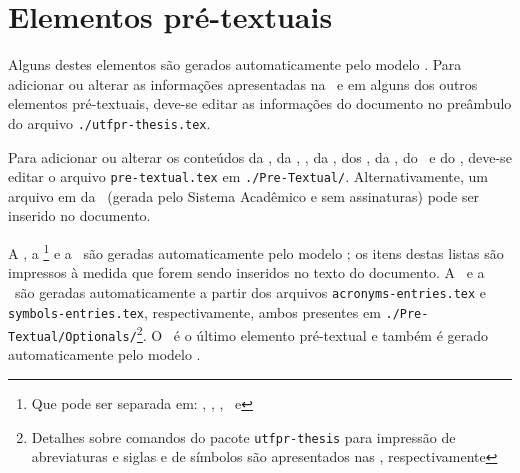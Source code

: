\section{Elementos pré-textuais}%
\label{sect:pre-text}

Alguns destes elementos são gerados automaticamente pelo modelo .
Para adicionar ou alterar as informações apresentadas na \cvrref\ e em alguns dos outros elementos pré-textuais, deve-se editar as informações do documento no preâmbulo do arquivo \texttt{./utfpr-thesis.tex}.

Para adicionar ou alterar os conteúdos da \ttlpgref, da \errref, \apvlpgref, da \dedref, dos \ackref, da \epiref, do \resref\ e do \absref, deve-se editar o arquivo \texttt{pre-textual.tex} em \texttt{./Pre-Textual/}.
Alternativamente, um arquivo em  da \apvlpgref\ (gerada pelo Sistema Acadêmico e sem assinaturas) pode ser inserido no documento.

A \loaref, a \loiref\footnote{Que pode ser separada em: \lofref, \lowref, \lopref, \lohref\ e \lodref} e a \lotref\ são geradas automaticamente pelo modelo ; os itens destas listas são impressos à medida que forem sendo inseridos no texto do documento.
A \acrref\ e a \symref\ são geradas automaticamente a partir dos arquivos \texttt{acronyms-entries.tex} e \texttt{symbols-entries.tex}, respectivamente, ambos presentes em \texttt{./Pre-Textual/Optionals/}\footnote{Detalhes sobre comandos do pacote \texttt{utfpr-thesis} para impressão de abreviaturas e siglas e de símbolos são apresentados nas , respectivamente}.
O \tocref\ é o último elemento pré-textual e também é gerado automaticamente pelo modelo .
